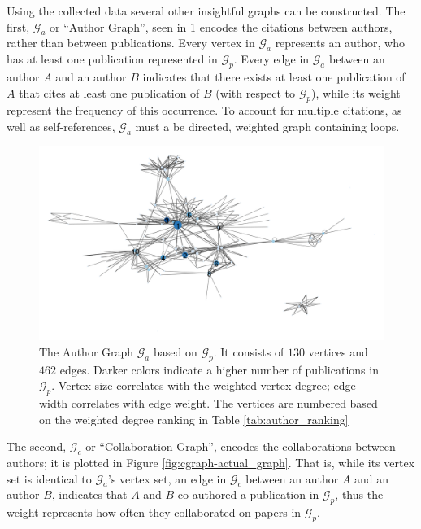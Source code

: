 \documentclass[11pt,a4paper]{book}
\theoremstyle{definition}
\theoremstyle{definition}
\theoremstyle{definition}
\theoremstyle{remark}
\newcommand{\pgraph}{\mathcal{G}_{p}}
\newcommand{\agraph}{\mathcal{G}_{a}}
\newcommand{\cgraph}{\mathcal{G}_{c}}
\begin{document}
Using the collected data several other insightful graphs can be constructed. The first, $\agraph$  or ``Author Graph'', seen in \ref{fig:agraph-actual_graph} encodes the citations between authors, rather than between publications. Every vertex in $\agraph$ represents an author, who has at least one publication represented in $\pgraph$. Every edge in $\agraph$ between an author $A$ and an author $B$ indicates that there exists at least one publication of $A$ that cites at least one publication of $B$ (with respect to $\pgraph$), while its weight represent the frequency of this occurrence. To account for multiple citations, as well as self-references, $\agraph$ must a be directed, weighted graph containing loops.

\begin{figure}[h!]
\includegraphics[width=\textwidth]{author_graph.png}
\caption{The Author Graph  $\agraph$ based on $\pgraph$. It consists of  $130$ vertices and $462$ edges. 
Darker colors indicate a higher number of publications in $\pgraph$. Vertex size correlates with the weighted vertex degree; 
edge width correlates with edge weight. The vertices are numbered based on the weighted degree ranking in Table \ref{tab:author_ranking}}
\label{fig:agraph-actual_graph}
\end{figure}


The second, $\cgraph$ or ``Collaboration Graph'', encodes the collaborations between authors; it is plotted in Figure \ref{fig:cgraph-actual_graph}. That is, while its vertex set is identical to $\agraph$'s vertex set, an edge in $\cgraph$ between an author $A$ and an author $B$, indicates that $A$ and $B$ co-authored a publication in $\pgraph$, thus the weight represents how often they collaborated on papers in $\pgraph$. 
\end{document}
